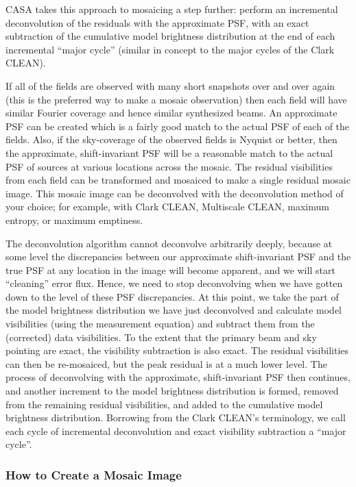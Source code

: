 CASA takes this approach to mosaicing a step further: perform
an incremental deconvolution of the residuals with the approximate PSF,
with an exact subtraction of the cumulative model brightness
distribution at the end of each incremental ``major cycle''
(similar in concept to the major cycles of the Clark CLEAN).

If all of the fields are observed with many short snapshots over and
over again (this is the preferred way to make a mosaic observation)
then each field will have similar Fourier coverage and hence similar
synthesized beams.  An approximate PSF can be created which is a
fairly good match to the actual PSF of each of the fields.  Also, if
the sky-coverage of the observed fields is Nyquist or better, then the
approximate, shift-invariant PSF will be a reasonable match to the
actual PSF of sources at various locations across the mosaic.  The
residual visibilities from each field can be transformed and mosaiced
to make a single residual mosaic image.  This mosaic image can be
deconvolved with the deconvolution method of your choice; for example,
with Clark CLEAN, Multiscale CLEAN, maximum entropy, or maximum
emptiness.

The deconvolution algorithm cannot deconvolve arbitrarily deeply,
because at some level the discrepancies between our approximate
shift-invariant PSF and the true PSF at any location in the image will
become apparent, and we will start ``cleaning'' error flux.  Hence, we
need to stop deconvolving when we have gotten down to the level of
these PSF discrepancies.  At this point, we take the part of the model
brightness distribution we have just deconvolved and calculate model
visibilities (using the measurement equation) and subtract them from
the (corrected) data visibilities.  To the extent that the primary
beam and sky pointing are exact, the visibility subtraction is also
exact.  The residual visibilities can then be re-mosaiced, but the
peak residual is at a much lower level.  The process of deconvolving
with the approximate, shift-invariant PSF then continues, and another
increment to the model brightness distribution is formed, removed from
the remaining residual visibilities, and added to the cumulative model
brightness distribution.  Borrowing from the Clark CLEAN's
terminology, we call each cycle of incremental deconvolution and exact
visibility subtraction a ``major cycle''.

\subsubsection{How to Create a Mosaic Image}
\label{subsubsection:synth.im.mos.how.to}

